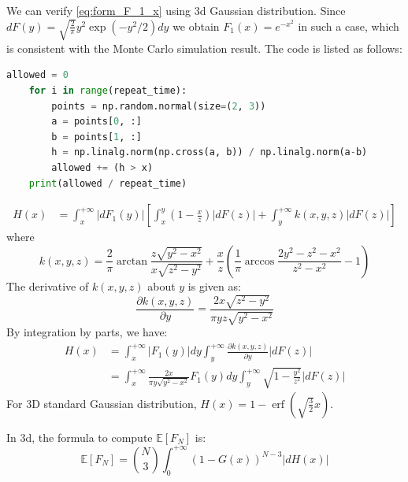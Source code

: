 \documentclass{article}
\def\E{\mathbb{E}}
\DeclareMathOperator{\erf}{erf}
\begin{document}
We can verify \eqref{eq:form_F_1_x} using 3d 
Gaussian distribution.
Since $dF(y)= \sqrt{\frac{2}{\pi}} y^2\exp(-y^2/2)dy$
we obtain $F_1(x)=e^{-x^2}$ in such a case, which is consistent
with the Monte Carlo simulation result. The code is listed
as follows:
\begin{lstlisting}[language=Python]
    allowed = 0
    for i in range(repeat_time):
        points = np.random.normal(size=(2, 3))
        a = points[0, :]
        b = points[1, :]
        h = np.linalg.norm(np.cross(a, b)) / np.linalg.norm(a-b)
        allowed += (h > x)
    print(allowed / repeat_time)
    \end{lstlisting}
\begin{align}
    H(x) & = \int_x^{+\infty}|dF_1(y)|
        \left[\int_x^{y} (1-\frac{x}{z}) |dF(z)|    
        + \int_y^{+\infty} k(x,y,z)|dF(z)|
        \right]
\end{align}
where
\begin{equation}
    k(x,y,z) = \frac{2}{\pi} \arctan \frac{z\sqrt{y^2-x^2}}{x\sqrt{z^2-y^2}}
    + \frac{x}{z}\left(\frac{1}{\pi} \arccos \frac{2y^2-z^2-x^2}{z^2-x^2}-1
    \right)
\end{equation}
The derivative of $k(x,y,z)$ about $y$ is given as:
\begin{equation*}
    \frac{\partial k(x,y,z)}{\partial y}
=\frac{2x \sqrt{z^2-y^2}}{\pi yz \sqrt{y^2-x^2}}
\end{equation*}
By integration by parts, we have:
\begin{align}
    H(x) & = \int_x^{+\infty}|F_1(y)|dy
\int_y^{+\infty} \frac{\partial k(x,y,z)}{\partial y}
|dF(z)| \\
& = \int_x^{+\infty}\frac{2x }{\pi y \sqrt{y^2-x^2}}F_1(y)dy
\int_y^{+\infty} \sqrt{1-\frac{y^2}{z^2}}\label{eq:H_general_simplification}
|dF(z)| 
\end{align}
For 3D standard Gaussian distribution, $H(x) = 1-\erf(\sqrt{\frac{3}{2}}x)$.

In 3d, the formula to compute $\E[F_N]$ is:
\begin{equation}\label{eq:F_N_H_G_d_3}
    \E[F_N] = \binom{N}{3}\int_0^{+\infty}(1-G(x))^{N-3}|dH(x)|   
\end{equation}
\end{document}
